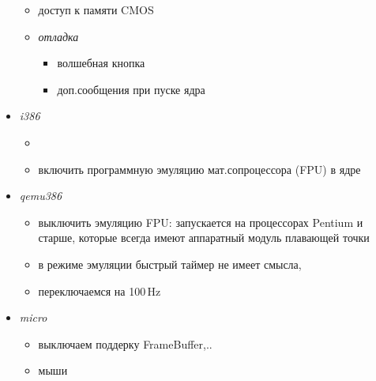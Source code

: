 \begin{itemize}[nosep]
\begin{itemize}
\item {} доступ к памяти CMOS

\item \emph{отладка}
  \begin{itemize}[nosep]
\item {} волшебная кнопка 
\item {} доп.сообщения при пуске ядра
  \end{itemize}

  \end{itemize}

  \item {} \emph{i386} 

\begin{itemize}[nosep]
  \item {}
  \item {} включить программную эмуляцию мат.сопроцессора
  (FPU) в ядре
\end{itemize}

  \item {} \emph{qemu386} 

\begin{itemize}[nosep]
\item {} выключить эмуляцию FPU:  запускается
на процессорах Pentium и старше, которые всегда имеют аппаратный модуль
плавающей точки
\item {}  в режиме эмуляции быстрый таймер не
имеет смысла,

\item {} переключаемся на 100\,Hz
\end{itemize}

\item {} \emph{micro}

\begin{itemize}[nosep]
\item {} выключаем поддерку FrameBuffer,..
\item {} мыши
\end{itemize}

\end{itemize}

 \label{azulibc}


